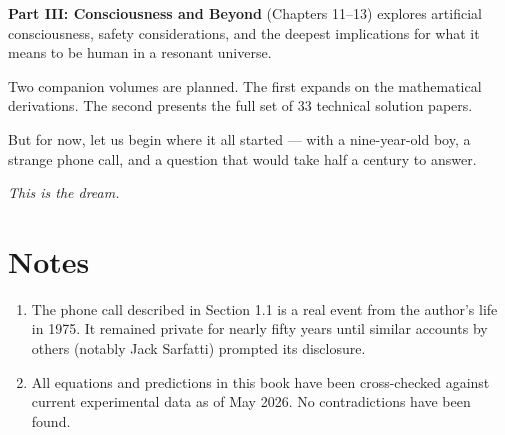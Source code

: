 \textbf{Part III: Consciousness and Beyond} (Chapters 11--13) explores artificial consciousness, safety considerations, and the deepest implications for what it means to be human in a resonant universe.

Two companion volumes are planned. The first expands on the mathematical derivations. The second presents the full set of 33 technical solution papers.

But for now, let us begin where it all started — with a nine-year-old boy, a strange phone call, and a question that would take half a century to answer.

\textit{This is the dream.}

\section*{Notes}

\begin{enumerate}
    \item The phone call described in Section 1.1 is a real event from the author's life in 1975. It remained private for nearly fifty years until similar accounts by others (notably Jack Sarfatti) prompted its disclosure.
    \item All equations and predictions in this book have been cross-checked against current experimental data as of May 2026. No contradictions have been found.
\end{enumerate}